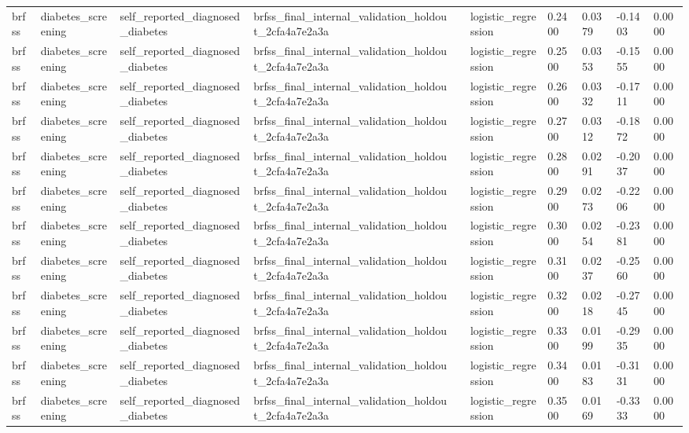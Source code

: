 \begin{tabular}{llllllllll}
brfss & diabetes\_screening & self\_reported\_diagnosed\_diabetes & brfss\_final\_internal\_validation\_holdout\_2cfa4a7e2a3a &  & logistic\_regression & 0.2400 & 0.0379 & -0.1403 & 0.0000 \\
brfss & diabetes\_screening & self\_reported\_diagnosed\_diabetes & brfss\_final\_internal\_validation\_holdout\_2cfa4a7e2a3a &  & logistic\_regression & 0.2500 & 0.0353 & -0.1555 & 0.0000 \\
brfss & diabetes\_screening & self\_reported\_diagnosed\_diabetes & brfss\_final\_internal\_validation\_holdout\_2cfa4a7e2a3a &  & logistic\_regression & 0.2600 & 0.0332 & -0.1711 & 0.0000 \\
brfss & diabetes\_screening & self\_reported\_diagnosed\_diabetes & brfss\_final\_internal\_validation\_holdout\_2cfa4a7e2a3a &  & logistic\_regression & 0.2700 & 0.0312 & -0.1872 & 0.0000 \\
brfss & diabetes\_screening & self\_reported\_diagnosed\_diabetes & brfss\_final\_internal\_validation\_holdout\_2cfa4a7e2a3a &  & logistic\_regression & 0.2800 & 0.0291 & -0.2037 & 0.0000 \\
brfss & diabetes\_screening & self\_reported\_diagnosed\_diabetes & brfss\_final\_internal\_validation\_holdout\_2cfa4a7e2a3a &  & logistic\_regression & 0.2900 & 0.0273 & -0.2206 & 0.0000 \\
brfss & diabetes\_screening & self\_reported\_diagnosed\_diabetes & brfss\_final\_internal\_validation\_holdout\_2cfa4a7e2a3a &  & logistic\_regression & 0.3000 & 0.0254 & -0.2381 & 0.0000 \\
brfss & diabetes\_screening & self\_reported\_diagnosed\_diabetes & brfss\_final\_internal\_validation\_holdout\_2cfa4a7e2a3a &  & logistic\_regression & 0.3100 & 0.0237 & -0.2560 & 0.0000 \\
brfss & diabetes\_screening & self\_reported\_diagnosed\_diabetes & brfss\_final\_internal\_validation\_holdout\_2cfa4a7e2a3a &  & logistic\_regression & 0.3200 & 0.0218 & -0.2745 & 0.0000 \\
brfss & diabetes\_screening & self\_reported\_diagnosed\_diabetes & brfss\_final\_internal\_validation\_holdout\_2cfa4a7e2a3a &  & logistic\_regression & 0.3300 & 0.0199 & -0.2935 & 0.0000 \\
brfss & diabetes\_screening & self\_reported\_diagnosed\_diabetes & brfss\_final\_internal\_validation\_holdout\_2cfa4a7e2a3a &  & logistic\_regression & 0.3400 & 0.0183 & -0.3131 & 0.0000 \\
brfss & diabetes\_screening & self\_reported\_diagnosed\_diabetes & brfss\_final\_internal\_validation\_holdout\_2cfa4a7e2a3a &  & logistic\_regression & 0.3500 & 0.0169 & -0.3333 & 0.0000 \\

\end{tabular}
